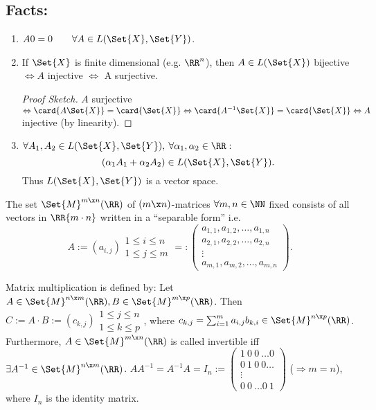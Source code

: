 \subsection*{Facts:}
\begin{enumerate}
 \item $A0=0\qquad\forall A\in L(\Set{X}, \Set{Y})$. 
 \item If $\Set{X}$ is finite dimensional (e.g. $\RR^n$), then $A\in L(\Set{X})$ bijective $\Leftrightarrow A$ injective $\Leftrightarrow$ A surjective.
 \begin{proof}[Proof Sketch]
  $A$ surjective $\Leftrightarrow \card{A \Set{X}}=\card{\Set{X}}\Leftrightarrow \card{A^{-1} \Set{X}}=\card{\Set{X}}\Leftrightarrow A$ injective (by linearity). 
 \end{proof}
 \item $\forall A_1, A_2\in L(\Set{X},\Set{Y}), \:\forall\alpha_1, \alpha_2\in\RR:$
 $$(\alpha_1 A_1+\alpha_2 A_2)\in L(\Set{X}, \Set{Y}).$$
 Thus $L(\Set{X},\Set{Y})$ is a vector space.
\end{enumerate}
\begin{defn}
 The set $\Set{M}^{m\x n}(\RR)$ of $(m\x n)$-matrices $\forall m,n\in\NN$ fixed consists of all vectors in $\RR{m\cdot n}$ written in a ``separable form'' i.e. $$A:=(a_{i,j})\begin{matrix}1\leq i\leq n\\1\leq j\leq m\end{matrix}=:\left(\begin{matrix}a_{1,1}, a_{1,2},\ldots, a_{1,n}\\a_{2,1}, a_{2,2},\ldots, a_{2,n}\\\vdots\\ a_{m,1}, a_{m,2},\ldots, a_{m,n}\end{matrix}\right).$$
\end{defn}
\begin{defn}
 Matrix multiplication is defined by:
 Let $A\in\Set{M}^{n\x m}(\RR), B\in\Set{M}^{m\x p}(\RR)$. Then $C:= A\cdot B:=(c_{k,j})\begin{matrix}1\leq j\leq n\\1\leq k\leq p\end{matrix}$, where $c_{k,j}=\sum_{i=1}^{m}a_{i,j}b_{k,i}\in\Set{M}^{n\x p}(\RR)$. Furthermore, $A\in\Set{M}^{m\x n}(\RR)$ is called invertible iff $\exists A^{-1}\in\Set{M}^{n\x m}(\RR)$. $AA^{-1}=A^{-1}A=I_n:=\left(\begin{matrix}1\ 0\ 0\ \ldots 0\\0\ 1\ 0\ 0\ldots\\\vdots\\0\ 0\ \ldots 0\ 1\end{matrix}\right)$ ($\Rightarrow m=n$), where $I_n$ is the identity matrix.
\end{defn}

